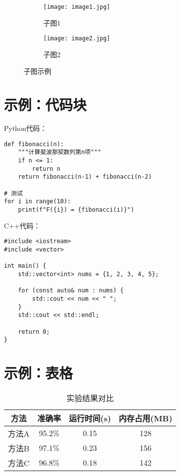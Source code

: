 \documentclass[12pt,a4paper]{article}
\numberwithin{equation}{section}
\begin{document}
\begin{figure}[H]
    \centering
    \begin{subfigure}{0.45\textwidth}
        \texttt{[image: image1.jpg]}
        \caption{子图1}
    \end{subfigure}
    \hfill
    \begin{subfigure}{0.45\textwidth}
        \texttt{[image: image2.jpg]}
        \caption{子图2}
    \end{subfigure}
    \caption{子图示例}
    \label{fig:subfigs}
\end{figure}

\section{示例：代码块}

Python代码：
\begin{lstlisting}[style=pythonstyle, caption=Python示例]
def fibonacci(n):
    """计算斐波那契数列第n项"""
    if n <= 1:
        return n
    return fibonacci(n-1) + fibonacci(n-2)

# 测试
for i in range(10):
    print(f"F({i}) = {fibonacci(i)}")
\end{lstlisting}

C++代码：
\begin{lstlisting}[style=cppstyle, caption=C++示例]
#include <iostream>
#include <vector>

int main() {
    std::vector<int> nums = {1, 2, 3, 4, 5};

    for (const auto& num : nums) {
        std::cout << num << " ";
    }
    std::cout << std::endl;

    return 0;
}
\end{lstlisting}

\section{示例：表格}

\begin{table}[H]
\centering
\caption{实验结果对比}
\begin{tabular}{|c|c|c|c|}
\hline
\textbf{方法} & \textbf{准确率} & \textbf{运行时间(s)} & \textbf{内存占用(MB)} \\
\hline
方法A & 95.2\% & 0.15 & 128 \\
\hline
方法B & 97.1\% & 0.23 & 156 \\
\hline
方法C & 96.8\% & 0.18 & 142 \\
\hline
\end{tabular}
\label{tab:results}
\end{table}
\end{document}
